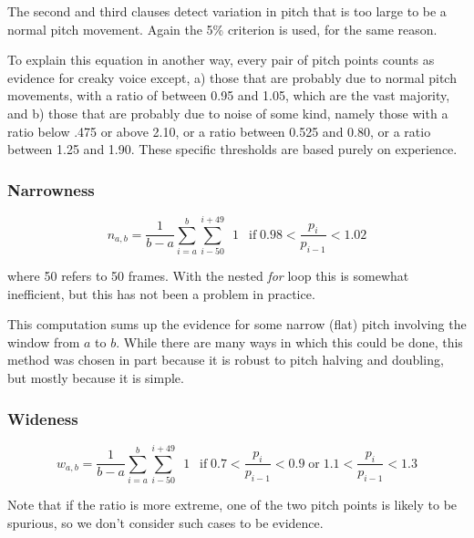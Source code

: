 \documentclass[11pt]{article}
\begin{document}
The second and third clauses detect variation in pitch that is too
large to be a normal pitch movement.  Again the 5\% criterion is used,
for the same reason.  

To explain this equation in another way, every pair of pitch points
counts as evidence for creaky voice except, a) those that are probably
due to normal pitch movements, with a ratio of between 0.95 and 1.05,
which are the vast majority, and b) those that are probably due to
noise of some kind, namely those with a ratio below .475 or above
2.10, or a ratio between 0.525 and 0.80, or a ratio between 1.25 and
1.90.  These specific thresholds are based purely on experience.

\subsubsection{Narrowness}

\begin{equation}
n_{a,b} = \frac{1}{b-a} \sum\limits_{i=a}^b \sum\limits_{i-50}^{i+49} \enspace 1 \enspace \operatorname{if} 0.98 <  \frac{p_i}{p_{i-1}} < 1.02 
\end{equation}

where 50 refers to 50 frames.  With the nested {\em for} loop this is
somewhat inefficient, but this has not been a problem in practice.

This computation sums up the evidence for some narrow (flat) pitch
involving the window from $a$ to $b$.  While there are many ways in
which this could be done, this method was chosen in part because it is
robust to pitch halving and doubling, but mostly because it is simple.




\subsubsection{Wideness}

\begin{equation}
w_{a,b} = \frac{1}{b-a} \sum\limits_{i=a}^b \sum\limits_{i-50}^{i+49} \enspace 1 \enspace \operatorname{if} 0.7 <  \frac{p_i}{p_{i-1}} < 0.9 \operatorname{or} 1.1 <  \frac{p_i}{p_{i-1}} < 1.3
\end{equation}

Note that if the ratio is more extreme, one of the two pitch points is
likely to be spurious, so we don't consider such cases to be evidence.
\end{document}
